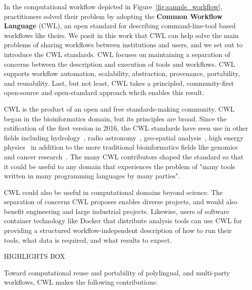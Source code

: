 \documentclass[sigconf,authordraft]{acmart}
\begin{document}
In the computational workflow depicted in Figure~\ref{fig:sample_workflow}, practitioners solved their problem by adopting the \textbf{Common Workflow Language} (CWL), an open standard for describing command-line-tool based workflows like theirs. We posit in this work that CWL can help solve the main problems of sharing workflows between institutions and users, and we set out to introduce the CWL standards. CWL focuses on maintaining a separation of concerns between the description and execution of tools and workflows. CWL supports workflow automation, scalability, abstraction, provenance, portability, and reusability. Last, but not least, CWL takes a principled, community-first open-source and open-standard approach whcih enables this result.

CWL is the product of an open and free standards-making community. CWL began in the bioinformatics domain, but its principles are broad. Since the ratification of the first version in 2016, the CWL standards have seen use in other fields including hydrology~\cite{noauthor_eoscpilot_nodate}, radio astronomy~\cite{noauthor_lofar_nodate}, geo-spatial analysis~\cite{simonis_ogc_2020,goncalves_ogc_2020,landry_ogc_2020}, high energy physics~\cite{bell_web-based_2017} in addition to the more traditional bioinformatics fields like genomics and cancer research~\cite{kaushik_building_2019}. The many CWL contributors shaped the standard so that it could be useful to any domain that experiences the problem of "many tools written in many programming languages by many parties".

CWL could also be useful in computational domains beyond science. The separation of concerns CWL proposes enables diverse projects, and would also benefit engineering and large industrial projects. Likewise, users of software container technology like Docker that distribute analysis tools can use CWL for providing a structured workflow-independent description of how to run their tools, what data is required, and what results to expect.

HIGHLIGHTS BOX

Toward computational reuse and portability of polylingual, and multi-party workflows, CWL makes the following contributions:
\end{document}
